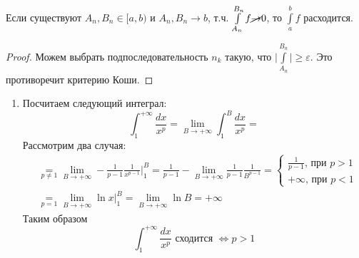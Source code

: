   \begin{notice}
    Если существуют $A_n, B_n \in [a, b)$ и $A_n, B_n \to b$, т.ч.
    $\int\limits_{A_n}^{B_n} f \cancel{\to} 0$, то $\int\limits_{a}^{b} f$ расходится.
  \end{notice}
  \begin{proof}
    Можем выбрать подпоследовательность $n_k$ такую, что $\Big| \int\limits_{A_n}^{B_n}\Big| \geq \varepsilon$. Это противоречит критерию Коши.
  \end{proof}
  
  \begin{examples}
    \begin{enumerate}
      \item Посчитаем следующий интеграл:
      \begin{equation*}
        \int_{1}^{+\infty} \frac{dx}{x^p} = \lim\limits_{B \to +\infty} \int_{1}^{B} \frac{dx}{x^p} =
      \end{equation*}
      Рассмотрим два случая:
      \begin{align*}
          &\underset{p \ne 1}{=} \lim_{B \to +\infty} -\frac{1}{p - 1} \frac{1}{x^{p - 1}}\Big|_{1}^{B} = \frac{1}{p - 1} - \lim\limits_{B \to +\infty} \frac{1}{p - 1}\frac{1}{B^{p - 1}} =
          \begin{cases}
              \frac{1}{p - 1}\text{, при $p > 1$}\\
              +\infty\text{, при $p < 1$}
          \end{cases} \\
          &\underset{p = 1}{=} \lim_{B \to +\infty} \ln x \Big|_{1}^{B} =
          \lim_{B \to +\infty} \ln B = +\infty
      \end{align*}
      Таким образом
      \begin{equation*}
          \int_{1}^{+\infty} \frac{dx}{x^p}\text{ сходится } \iff p > 1
      \end{equation*}
  

\end{enumerate}
\end{examples}
